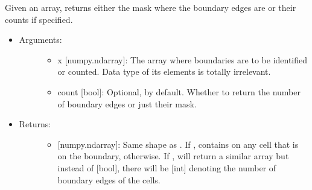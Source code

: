 \documentclass[letterpaper,10pt,english]{sphinxmanual}
\begin{document}

\begin{fulllineitems}
\label{\detokenize{spatial:data_tools.spatial.get_boundaries}}
Given an array, returns either the mask where the boundary edges are
or their counts if specified.
\begin{itemize}
\item {} \begin{description}
\item[{Arguments:}] \leavevmode\begin{itemize}
\item {} 
x {[}numpy.ndarray{]}: The array where boundaries are to be
identified or counted. Data type of its elements is totally
irrelevant.

\item {} 
count {[}bool{]}: Optional,  by default. Whether to
return the number of boundary edges or just their mask.

\end{itemize}

\end{description}

\item {} \begin{description}
\item[{Returns:}] \leavevmode\begin{itemize}
\item {} 
{[}numpy.ndarray{]}: Same shape as . If ,
contains  on any cell that is on the boundary,
 otherwise. If , will return a
similar array but instead of {[}bool{]}, there will be {[}int{]}
denoting the number of boundary edges of the cells.

\end{itemize}

\end{description}


\end{itemize}
\end{fulllineitems}
\end{document}

